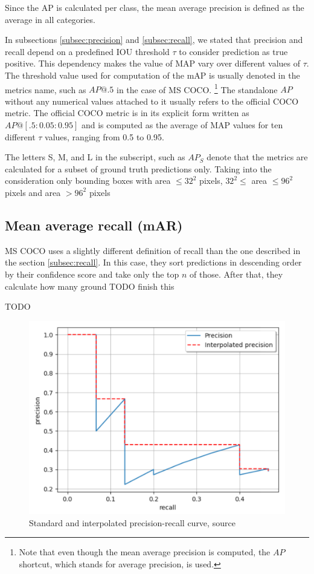 Since the AP is calculated per class, the mean average precision is defined as the average  in all categories.

In subsections \ref{subsec:precision} and \ref{subsec:recall}, we stated that precision and recall depend on a predefined IOU threshold $\tau$ to consider prediction as true positive. This dependency makes the value of MAP vary over different values of $\tau$. The threshold value used for computation of the mAP is usually denoted in the metrics name, such as $AP@.5$ in the case of MS COCO. \footnote{Note that even though the mean average precision is computed, the $AP$ shortcut, which stands for average precision, is used.} The standalone $AP$ without any numerical values attached to it usually refers to the official COCO metric. The official COCO metric is in its explicit form written as $AP@[.5:0.05:0.95]$ and is computed as the average of MAP values for ten different $\tau$ values, ranging from 0.5 to 0.95.

The letters S, M,  and L in the subscript, such as $AP_S$ denote that the metrics are calculated for a subset of ground truth predictions only. Taking into the consideration only bounding boxes with area $\leq 32^2$ pixels, $32^2 \le $ area $ \leq 96^2$ pixels and area $> 96^2$ pixels

\subsection{Mean average recall (mAR)}
MS COCO uses a slightly different definition of recall than the one described in the section \ref{subsec:recall}. In this case, they sort predictions in descending order by their confidence score and take only the top $n$ of those. After that, they calculate how many ground TODO finish this

TODO


\begin{figure}
    \includegraphics[width = \linewidth]{images/PR-curve.png}
    \caption{Standard and interpolated precision-recall curve, source \cite{Padilla2020}}
    \label{fig:pr_curve}
\end{figure}


